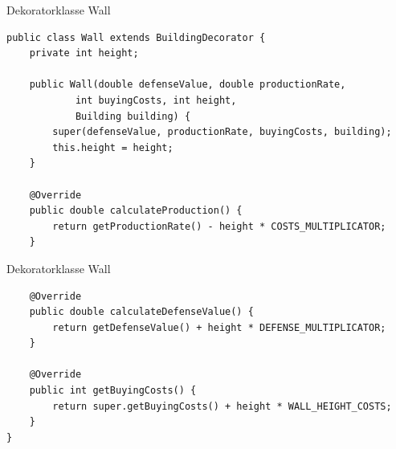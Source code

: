 \begin{frame}[fragile]{Dekoratorklasse Wall}
	\begin{exampleblock}{}
        \begin{lstlisting}
public class Wall extends BuildingDecorator {
	private int height;
	
	public Wall(double defenseValue, double productionRate, 
            int buyingCosts, int height, 
            Building building) {
		super(defenseValue, productionRate, buyingCosts, building);
		this.height = height;
	}

	@Override
	public double calculateProduction() {
		return getProductionRate() - height * COSTS_MULTIPLICATOR;
	}

        \end{lstlisting}
	\end{exampleblock}
\end{frame}

\begin{frame}[fragile]{Dekoratorklasse Wall}
	\begin{exampleblock}{}
        \begin{lstlisting}
	@Override
	public double calculateDefenseValue() {
		return getDefenseValue() + height * DEFENSE_MULTIPLICATOR;
	}
	
	@Override
	public int getBuyingCosts() {
		return super.getBuyingCosts() + height * WALL_HEIGHT_COSTS;
	}
}

        \end{lstlisting}
	\end{exampleblock}
\end{frame}